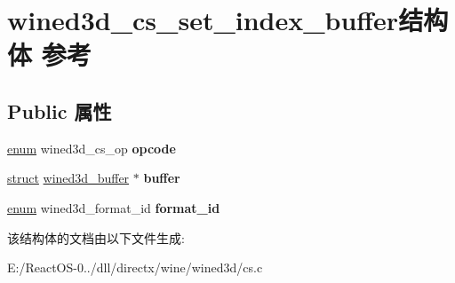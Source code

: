 \hypertarget{structwined3d__cs__set__index__buffer}{}\section{wined3d\+\_\+cs\+\_\+set\+\_\+index\+\_\+buffer结构体 参考}
\label{structwined3d__cs__set__index__buffer}
\subsection*{Public 属性}
\begin{DoxyCompactItemize}
\item 
\mbox{\label{structwined3d__cs__set__index__buffer_a13c54e024a8a5325a9a6a2694cad3b6d}} 
\hyperlink{interfaceenum}{enum} wined3d\+\_\+cs\+\_\+op {\bfseries opcode}
\item 
\mbox{\label{structwined3d__cs__set__index__buffer_a6c6a4c038a2cb4d4559acdc6ecd453e6}} 
\hyperlink{interfacestruct}{struct} \hyperlink{structwined3d__buffer}{wined3d\+\_\+buffer} $\ast$ {\bfseries buffer}
\item 
\mbox{\label{structwined3d__cs__set__index__buffer_a0b02803ae3baeced0a6b26dc3a04d06e}} 
\hyperlink{interfaceenum}{enum} wined3d\+\_\+format\+\_\+id {\bfseries format\+\_\+id}
\end{DoxyCompactItemize}


该结构体的文档由以下文件生成\+:\begin{DoxyCompactItemize}
\item 
E\+:/\+React\+O\+S-\/0../dll/directx/wine/wined3d/cs.\+c\end{DoxyCompactItemize}
